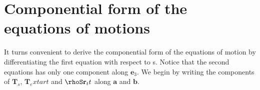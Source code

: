 

\section{Componential form of the equations of motions}\label{componential-form-of-the-equations-of-motion}
It turns convenient to derive the componential form of the equations of motion by differentiating the first equation with respect to s.
Notice that the second equations has only one component along $\mathbf{e}_3$.
We begin by writing the components of $\mathbf{T}_s$, $\mathbf{T}_extart$ and $\rhoS\mathbf{r}_tt$ along $\mathbf{a}$ and $\mathbf{b}$.

 
 
 
 
 
 
  
  
  
  